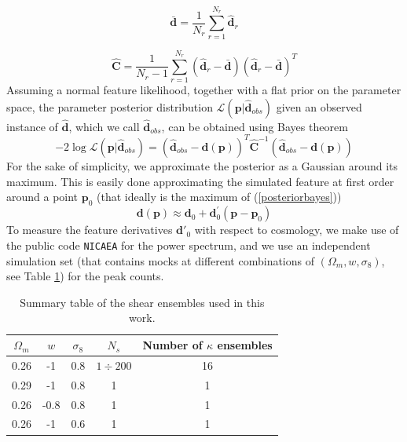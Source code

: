 \documentclass[reprint,aps,prd,superscriptaddress,showkeys,showpacs]{revtex4-1}
\newcommand{\bb}[1]{\mathbf{#1}}
\newcommand{\bbh}[1]{\mathbf{\hat{#1}}}
\begin{document}
\begin{equation}
\bb{\bar{d}} = \frac{1}{N_r}\sum_{r=1}^{N_r} \bbh{d}_r
\end{equation}

\begin{equation}
\label{covest}
\bbh{C} = \frac{1}{N_r-1}\sum_{r=1}^{N_r} (\bbh{d}_r - \bar{\bb{d}}) (\bbh{d}_r - \bar{\bb{d}})^T
\end{equation}
%
Assuming a normal feature likelihood, together with a flat prior on the parameter space, the parameter posterior distribution $\mathcal{L}(\bb{p}\vert\bbh{d}_{obs})$ given an observed instance of $\bbh{d}$, which we call $\bbh{d}_{obs}$, can be obtained using Bayes theorem
\begin{equation}
\label{posteriorbayes}
-2\log\mathcal{L}(\bb{p}\vert\bbh{d}_{obs}) = (\bbh{d}_{obs}-\bb{d}(\bb{p}))^T\bbh{C}^{-1}(\bbh{d}_{obs}-\bb{d}(\bb{p}))
\end{equation}
%
For the sake of simplicity, we approximate the posterior as a Gaussian around its maximum. This is easily done approximating the simulated feature at first order around a point $\bb{p}_0$ (that ideally is the maximum of (\ref{posteriorbayes}))
\begin{equation}
\bb{d}(\bb{p}) \approx \bb{d}_0 + \bb{d}_0^\prime(\bb{p}-\bb{p}_0) 
\end{equation}
%
To measure the feature derivatives $\bb{d}'_0$ with respect to cosmology, we make use of the public code \texttt{NICAEA} \citep{Nicaea} for the power spectrum, and we use an independent simulation set (that contains mocks at different combinations of $(\Omega_m,w,\sigma_8)$, see Table \ref{simtable}) for the peak counts.

\begin{table}
\begin{center}
\begin{tabular}{c|c|c||c|c}
\toprule
$\Omega_m$ &  $w$ & $\sigma_8$ & $N_s$ & Number of $\kappa$ ensembles \\ \hline \hline
\midrule

0.26 & -1 & 0.8 & $1\div 200$ & 16 \\
0.29 & -1 & 0.8 & 1 & 1 \\
0.26 & -0.8 & 0.8 & 1 & 1 \\
0.26 & -1 & 0.6 & 1 & 1 \\

\bottomrule
\end{tabular}
\end{center}
\caption{Summary table of the shear ensembles used in this work.}
\label{simtable}
\end{table}
\end{document}
